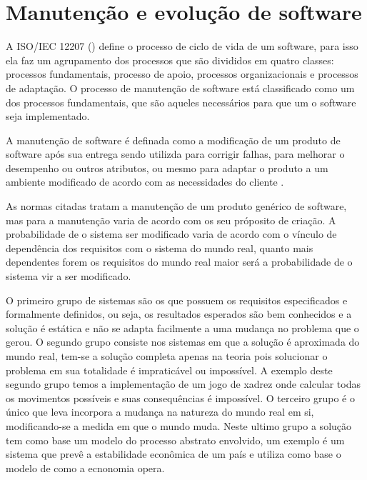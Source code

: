 \chapter{Manutenção e evolução de software}
\label{evol-software}


A ISO/IEC 12207 (\citeyear{iso12207}) define o processo de ciclo de vida de um software, para isso ela faz um agrupamento dos processos que são divididos em quatro classes: processos fundamentais, processo de apoio, processos organizacionais e processos de adaptação. O processo de manutenção de software está classificado como um dos processos fundamentais, que são aqueles necessários para que um o software seja implementado.

A manutenção de software é definada como a modificação de um produto de software após sua entrega sendo utilizda para corrigir falhas, para melhorar o desempenho ou outros atributos, ou mesmo para adaptar o produto a um ambiente modificado de acordo com as necessidades do cliente \cite{ieee1219}.

As normas citadas tratam a manutenção de um produto genérico de software, mas para \cite[p.~380]{pfleeger2004engenharia} a manutenção varia de acordo com os seu próposito de criação. A probabilidade de o sistema ser modificado varia de acordo com o vínculo de dependência dos requisitos com o sistema do mundo real, quanto mais dependentes forem os requisitos do mundo real maior será a probabilidade de o sistema vir a ser modificado.

O primeiro grupo de sistemas são os que possuem os requisitos especificados e formalmente definidos, ou seja, os resultados esperados são bem conhecidos e a solução é estática e não se adapta facilmente a uma mudança no problema que o gerou. O segundo grupo consiste nos sistemas em que a solução é aproximada do mundo real, tem-se a solução completa apenas na teoria pois solucionar o problema em sua totalidade é impraticável ou impossível. A exemplo deste segundo grupo temos a implementação de um jogo de xadrez onde calcular todas os movimentos possíveis e suas consequências é impossível. O terceiro grupo é o único que leva incorpora a mudança na natureza do mundo real em si,  modificando-se a medida em que o mundo muda. Neste ultimo grupo a solução tem como base um modelo do processo abstrato envolvido, um exemplo é um sistema que prevê a estabilidade econômica de um país e utiliza como base o modelo de como a ecnonomia opera.


